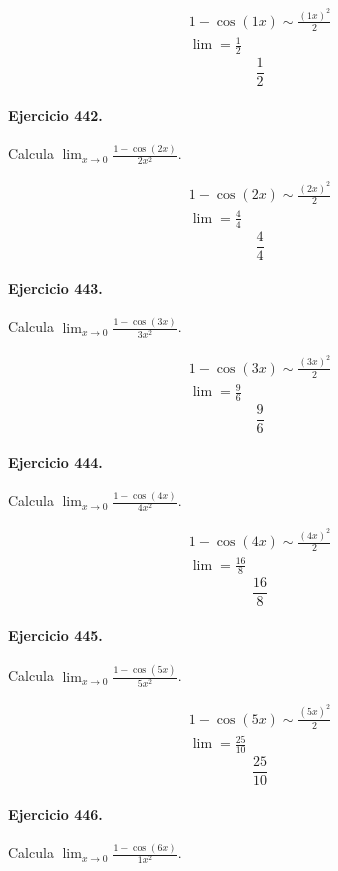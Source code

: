 \documentclass[11pt,a4paper]{article}
\begin{document}
\[
\begin{aligned}
1-\cos(1x)\sim \frac{(1x)^2}{2}\\
\lim=\frac{1}{2}
\end{aligned}
\]
\[\boxed{\frac{1}{2}}\]


\paragraph{Ejercicio 442.} Calcula $\displaystyle\lim_{x\to0}\frac{1-\cos(2x)}{2x^2}$.

\[
\begin{aligned}
1-\cos(2x)\sim \frac{(2x)^2}{2}\\
\lim=\frac{4}{4}
\end{aligned}
\]
\[\boxed{\frac{4}{4}}\]


\paragraph{Ejercicio 443.} Calcula $\displaystyle\lim_{x\to0}\frac{1-\cos(3x)}{3x^2}$.

\[
\begin{aligned}
1-\cos(3x)\sim \frac{(3x)^2}{2}\\
\lim=\frac{9}{6}
\end{aligned}
\]
\[\boxed{\frac{9}{6}}\]


\paragraph{Ejercicio 444.} Calcula $\displaystyle\lim_{x\to0}\frac{1-\cos(4x)}{4x^2}$.

\[
\begin{aligned}
1-\cos(4x)\sim \frac{(4x)^2}{2}\\
\lim=\frac{16}{8}
\end{aligned}
\]
\[\boxed{\frac{16}{8}}\]


\paragraph{Ejercicio 445.} Calcula $\displaystyle\lim_{x\to0}\frac{1-\cos(5x)}{5x^2}$.

\[
\begin{aligned}
1-\cos(5x)\sim \frac{(5x)^2}{2}\\
\lim=\frac{25}{10}
\end{aligned}
\]
\[\boxed{\frac{25}{10}}\]


\paragraph{Ejercicio 446.} Calcula $\displaystyle\lim_{x\to0}\frac{1-\cos(6x)}{1x^2}$.
\end{document}
